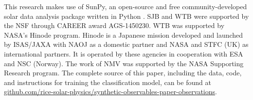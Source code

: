 \documentclass[modern,linenumbers,longauthor]{aastex63}
\begin{document}






\acknowledgments
This research makes use of SunPy, an open-source and free community-developed solar data analysis package written in Python \citep{the_sunpy_community_sunpy_2020}. 
SJB and WTB were supported by the NSF through CAREER award AGS-1450230.
WTB was supported by NASA’s Hinode program.
Hinode is a Japanese mission developed and launched by ISAS/JAXA with NAOJ as a domestic partner and NASA and STFC (UK) as international partners.
It is operated by these agencies in cooperation with ESA and NSC (Norway).
The work of NMV was supported by the NASA Supporting Research program.
The complete source of this paper, including the data, code, and instructions for training the classification model, can be found at \href{https://github.com/rice-solar-physics/synthetic-observables-paper-observations}{github.com/rice-solar-physics/synthetic-observables-paper-observations}.






\listofchanges
\end{document}
